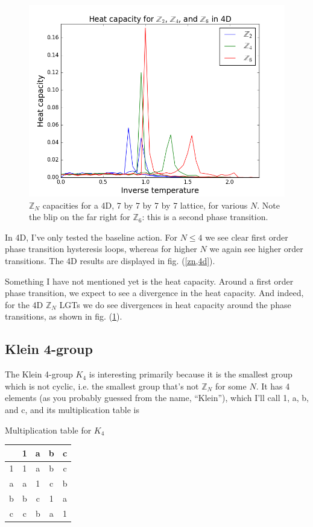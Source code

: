 \documentclass[9pt,twocolumn,twoside]{article}
\begin{document}
\begin{figure}[h!]
	\begin{centering}
	\includegraphics[width=\columnwidth]{heatcapz2z4z6,4d}
	\caption{$\mathbb{Z}_N$ capacities for a 4D, 7 by 7 by 7 by 7 lattice, for various $N$.  Note the blip on the far right for $\mathbb{Z}_6$: this is a second phase transition. }
	\label{heatcapz}
	\end{centering}
\end{figure}

In 4D, I've only tested the baseline action.  For $N\leq 4$ we see clear first order phase transition hysteresis loops, whereas for higher $N$ we again see higher order transitions.  The 4D results are displayed in fig. (\ref{zn,4d}).  

Something I have not mentioned yet is the heat capacity.  Around a first order phase transition, we expect to see a divergence in the heat capacity.  And indeed, for the 4D $\mathbb{Z}_N$ LGTs we do see divergences in heat capacity around the phase transitions, as shown in fig. (\ref{heatcapz}).

\subsection{Klein 4-group}
The Klein 4-group $K_4$ is interesting primarily because it is the smallest group which is not cyclic, i.e. the smallest group that's not $\mathbb{Z}_N$ for some $N$.  It has 4 elements (as you probably guessed from the name, ``Klein''), which I'll call 1, a, b, and c, and its multiplication table is

\begin{table}[h!]
\centering
Multiplication table for $K_4$

\begin{tabular} {c | c c c c }
& 1 & a & b & c \\
\hline
1 & 1 & a & b & c \\
a & a & 1 & c & b \\
b & b & c & 1 & a \\
c & c & b & a & 1 \\
\end{tabular}
\end{table}
\end{document}
